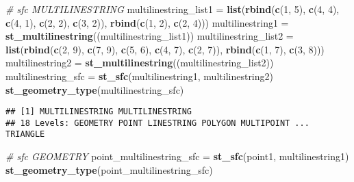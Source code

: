 \documentclass[]{article}
\newenvironment{Shaded}{\begin{snugshade}}{\end{snugshade}}
\newcommand{\CommentTok}[1]{\textcolor[rgb]{0.56,0.35,0.01}{\textit{#1}}}
\newcommand{\DecValTok}[1]{\textcolor[rgb]{0.00,0.00,0.81}{#1}}
\newcommand{\KeywordTok}[1]{\textcolor[rgb]{0.13,0.29,0.53}{\textbf{#1}}}
\newcommand{\NormalTok}[1]{#1}
\newcommand{\StringTok}[1]{\textcolor[rgb]{0.31,0.60,0.02}{#1}}
\begin{document}
\begin{Shaded}
\begin{Highlighting}[]
\CommentTok{# sfc MULTILINESTRING}
\NormalTok{multilinestring_list1 =}\StringTok{ }\KeywordTok{list}\NormalTok{(}\KeywordTok{rbind}\NormalTok{(}\KeywordTok{c}\NormalTok{(}\DecValTok{1}\NormalTok{, }\DecValTok{5}\NormalTok{), }\KeywordTok{c}\NormalTok{(}\DecValTok{4}\NormalTok{, }\DecValTok{4}\NormalTok{), }\KeywordTok{c}\NormalTok{(}\DecValTok{4}\NormalTok{, }\DecValTok{1}\NormalTok{), }\KeywordTok{c}\NormalTok{(}\DecValTok{2}\NormalTok{, }\DecValTok{2}\NormalTok{), }\KeywordTok{c}\NormalTok{(}\DecValTok{3}\NormalTok{, }\DecValTok{2}\NormalTok{)),}
                             \KeywordTok{rbind}\NormalTok{(}\KeywordTok{c}\NormalTok{(}\DecValTok{1}\NormalTok{, }\DecValTok{2}\NormalTok{), }\KeywordTok{c}\NormalTok{(}\DecValTok{2}\NormalTok{, }\DecValTok{4}\NormalTok{)))}
\NormalTok{multilinestring1 =}\StringTok{ }\KeywordTok{st_multilinestring}\NormalTok{((multilinestring_list1))}
\NormalTok{multilinestring_list2 =}\StringTok{ }\KeywordTok{list}\NormalTok{(}\KeywordTok{rbind}\NormalTok{(}\KeywordTok{c}\NormalTok{(}\DecValTok{2}\NormalTok{, }\DecValTok{9}\NormalTok{), }\KeywordTok{c}\NormalTok{(}\DecValTok{7}\NormalTok{, }\DecValTok{9}\NormalTok{), }\KeywordTok{c}\NormalTok{(}\DecValTok{5}\NormalTok{, }\DecValTok{6}\NormalTok{), }\KeywordTok{c}\NormalTok{(}\DecValTok{4}\NormalTok{, }\DecValTok{7}\NormalTok{), }\KeywordTok{c}\NormalTok{(}\DecValTok{2}\NormalTok{, }\DecValTok{7}\NormalTok{)),}
                             \KeywordTok{rbind}\NormalTok{(}\KeywordTok{c}\NormalTok{(}\DecValTok{1}\NormalTok{, }\DecValTok{7}\NormalTok{), }\KeywordTok{c}\NormalTok{(}\DecValTok{3}\NormalTok{, }\DecValTok{8}\NormalTok{)))}
\NormalTok{multilinestring2 =}\StringTok{ }\KeywordTok{st_multilinestring}\NormalTok{((multilinestring_list2))}
\NormalTok{multilinestring_sfc =}\StringTok{ }\KeywordTok{st_sfc}\NormalTok{(multilinestring1, multilinestring2)}
\KeywordTok{st_geometry_type}\NormalTok{(multilinestring_sfc)}
\end{Highlighting}
\end{Shaded}

\begin{verbatim}
## [1] MULTILINESTRING MULTILINESTRING
## 18 Levels: GEOMETRY POINT LINESTRING POLYGON MULTIPOINT ... TRIANGLE
\end{verbatim}

\begin{Shaded}
\begin{Highlighting}[]
\CommentTok{# sfc GEOMETRY}
\NormalTok{point_multilinestring_sfc =}\StringTok{ }\KeywordTok{st_sfc}\NormalTok{(point1, multilinestring1)}
\KeywordTok{st_geometry_type}\NormalTok{(point_multilinestring_sfc)}
\end{Highlighting}
\end{Shaded}
\end{document}
